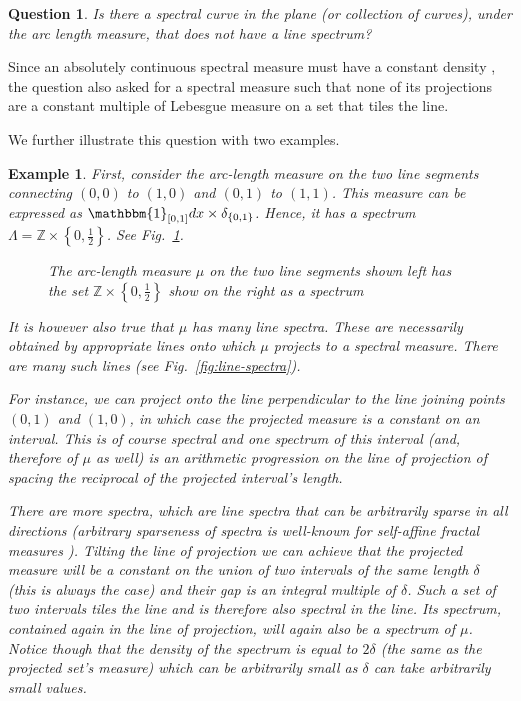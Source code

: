 \documentclass[12pt,a4paper,oneside]{amsart}
\newtheorem{example}{Example}
\newtheorem{question}{Question}
\theoremstyle{definition}
\newcommand{\Set}[1]{{\left\{{#1}\right\}}}
\newcommand{\ZZ}{{\mathbb Z}}
\newcommand{\one}{{\mathbbm{1}}}
\newcounter{rem}
\begin{document}
\begin{question}\label{line-spectra-only}
Is there a spectral curve in the plane (or collection of curves), under the arc length measure, that does not have a line spectrum?
\end{question}

Since an absolutely continuous spectral measure must have a constant density \cite{dutkay2014uniformity}, the question also asked for a spectral measure such that none of its projections {are a constant multiple of Lebesgue measure on a set that tiles the line.}

We further illustrate this question with two examples.

\begin{example}
    \rm{First, consider the arc-length measure on the two line segments connecting $(0, 0)$ to $(1, 0)$ and $(0, 1)$ to $(1, 1)$. This measure can be expressed as $\one_{[0,1]}dx\times \delta_{\{0,1\}}$. Hence, it has  a spectrum $\Lambda = \ZZ\times\Set{0, \frac12}$. See Fig.\ \ref{fig:stack-1}.}

\begin{figure}[h]
\ifdefined\SMART\resizebox{4cm}{!}{}\else

\fi
\caption{The arc-length measure $\mu$ on the two line segments shown left has the set $\ZZ\times\Set{0, \frac12}$ show on the right as a spectrum}\label{fig:stack-1}
\end{figure}
\textrm{It is however also true that $\mu$ has many line spectra. These are necessarily obtained by appropriate lines onto which $\mu$ projects to a spectral measure. There are many such lines (see Fig.\ \ref{fig:line-spectra}).}

\textrm{For instance, we can project onto the line perpendicular to the line joining points $(0, 1)$ and $(1, 0)$, in which case the projected measure is a constant on an interval. This is of course spectral and one spectrum of this interval (and, therefore of $\mu$ as well) is an arithmetic progression on the line of projection of spacing the reciprocal of the projected interval's length. }

\textrm{There are more spectra, which are line spectra that can be arbitrarily sparse in all directions (arbitrary sparseness of spectra is well-known for self-affine fractal measures {\cite{AL2023}}). Tilting the line of projection we can achieve that the projected measure will be a constant on the union of two intervals of the same length $\delta$ (this is always the case) and their gap is an integral multiple of $\delta$. Such a set of two intervals tiles the line and is therefore \cite{laba2001twointervals} also spectral in the line. Its spectrum, contained again in the line of projection, will again also be a spectrum of $\mu$. Notice though that the density of the spectrum is equal to $2\delta$ (the same as the projected set's measure) which can be arbitrarily small as $\delta$ can take arbitrarily small values.} 


\end{example}
\end{document}
